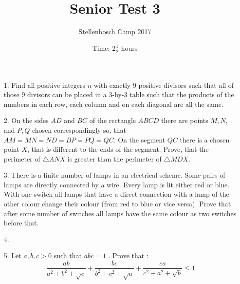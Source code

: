 \documentclass[12pt]{article}
\title{Senior Test 3}
\author{Stellenbosch Camp 2017}
\date{Time: $2\frac{1}{2}$ hours}
\begin{document}
 \maketitle

\begin{enumerate}

\item[1.] %
Find all positive integers $n$ with exactly 9 positive divisors such that all of those 9 divisors can be placed in a 3-by-3 table such that the products of the numbers in each row, each column and on each diagonal are all the same.


\item[2.] %
On the sides $AD$ and $BC$ of the rectangle $ABCD$ there are points $M, N$, and $P, Q$ chosen correspondingly so, that $AM = MN = ND = BP = PQ = QC$. On the segment $QC$ there is a chosen point $X$, that is different to the ends of the segment. Prove, that the perimeter of $\triangle ANX$ is greater than the perimeter of $\triangle MDX$.


\item[3.] %
There is a finite number of lamps in an electrical scheme. Some pairs of lamps are directly connected by a wire. Every lamp is lit either red or blue. With one switch all lamps that have a direct connection with a lamp of the other colour change their colour (from red to blue or vice versa). Prove that after some number of switches all lamps have the same colour as two switches before that.


\item[4.] %


\item[5.] %
Let $ a,b,c > 0$ such that $ abc = 1$ . Prove that :
    $$ \frac {ab}{a^2 + b^2 + \sqrt {c}} + \frac {bc}{b^2 + c^2 + \sqrt {a}} + \frac {ca}{c^2 + a^2 + \sqrt {b}}\le 1 $$


\end{enumerate}
\end{document}
